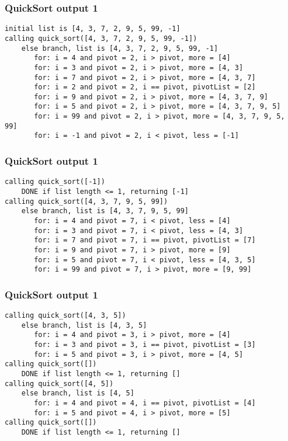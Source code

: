 \documentclass{beamer}
\begin{document}
    \begin{frame}[fragile]
        \frametitle{QuickSort output 1}
        \scriptsize
        \begin{verbatim}
initial list is [4, 3, 7, 2, 9, 5, 99, -1]
calling quick_sort([4, 3, 7, 2, 9, 5, 99, -1])
    else branch, list is [4, 3, 7, 2, 9, 5, 99, -1]
       for: i = 4 and pivot = 2, i > pivot, more = [4]
       for: i = 3 and pivot = 2, i > pivot, more = [4, 3]
       for: i = 7 and pivot = 2, i > pivot, more = [4, 3, 7]
       for: i = 2 and pivot = 2, i == pivot, pivotList = [2]
       for: i = 9 and pivot = 2, i > pivot, more = [4, 3, 7, 9]
       for: i = 5 and pivot = 2, i > pivot, more = [4, 3, 7, 9, 5]
       for: i = 99 and pivot = 2, i > pivot, more = [4, 3, 7, 9, 5, 99]
       for: i = -1 and pivot = 2, i < pivot, less = [-1]
        \end{verbatim}
    \end{frame}

    \begin{frame}[fragile]
        \frametitle{QuickSort output 1}
        \scriptsize
        \begin{verbatim}
calling quick_sort([-1])
    DONE if list length <= 1, returning [-1]
calling quick_sort([4, 3, 7, 9, 5, 99])
    else branch, list is [4, 3, 7, 9, 5, 99]
       for: i = 4 and pivot = 7, i < pivot, less = [4]
       for: i = 3 and pivot = 7, i < pivot, less = [4, 3]
       for: i = 7 and pivot = 7, i == pivot, pivotList = [7]
       for: i = 9 and pivot = 7, i > pivot, more = [9]
       for: i = 5 and pivot = 7, i < pivot, less = [4, 3, 5]
       for: i = 99 and pivot = 7, i > pivot, more = [9, 99]
        \end{verbatim}
    \end{frame}

    \begin{frame}[fragile]
        \frametitle{QuickSort output 1}
        \scriptsize
        \begin{verbatim}
calling quick_sort([4, 3, 5])
    else branch, list is [4, 3, 5]
       for: i = 4 and pivot = 3, i > pivot, more = [4]
       for: i = 3 and pivot = 3, i == pivot, pivotList = [3]
       for: i = 5 and pivot = 3, i > pivot, more = [4, 5]
calling quick_sort([])
    DONE if list length <= 1, returning []
calling quick_sort([4, 5])
    else branch, list is [4, 5]
       for: i = 4 and pivot = 4, i == pivot, pivotList = [4]
       for: i = 5 and pivot = 4, i > pivot, more = [5]
calling quick_sort([])
    DONE if list length <= 1, returning []
        \end{verbatim}
    \end{frame}
\end{document}
